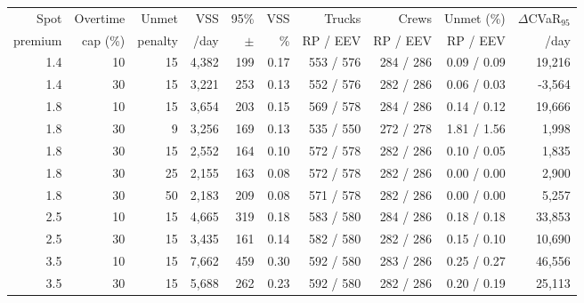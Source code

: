 \begin{tabular}{@{}rrrrrrrrrr@{}}\toprule
Spot & Overtime & Unmet & VSS & 95\% & VSS & Trucks & Crews & Unmet (\%) & $\Delta$CVaR$_{95}$ \\
premium & cap (\%) & penalty & \EUR{}/day & $\pm$ & \% & RP / EEV & RP / EEV & RP / EEV & \EUR{}/day \\ \midrule
1.4 & 10 & 15 & 4{,}382 & 199 & 0.17 & 553 / 576 & 284 / 286 & 0.09 / 0.09 & 19{,}216 \\
1.4 & 30 & 15 & 3{,}221 & 253 & 0.13 & 552 / 576 & 282 / 286 & 0.06 / 0.03 & -3{,}564 \\
1.8 & 10 & 15 & 3{,}654 & 203 & 0.15 & 569 / 578 & 284 / 286 & 0.14 / 0.12 & 19{,}666 \\
1.8 & 30 & 9 & 3{,}256 & 169 & 0.13 & 535 / 550 & 272 / 278 & 1.81 / 1.56 & 1{,}998 \\
1.8 & 30 & 15 & 2{,}552 & 164 & 0.10 & 572 / 578 & 282 / 286 & 0.10 / 0.05 & 1{,}835 \\
1.8 & 30 & 25 & 2{,}155 & 163 & 0.08 & 572 / 578 & 282 / 286 & 0.00 / 0.00 & 2{,}900 \\
1.8 & 30 & 50 & 2{,}183 & 209 & 0.08 & 571 / 578 & 282 / 286 & 0.00 / 0.00 & 5{,}257 \\
2.5 & 10 & 15 & 4{,}665 & 319 & 0.18 & 583 / 580 & 284 / 286 & 0.18 / 0.18 & 33{,}853 \\
2.5 & 30 & 15 & 3{,}435 & 161 & 0.14 & 582 / 580 & 282 / 286 & 0.15 / 0.10 & 10{,}690 \\
3.5 & 10 & 15 & 7{,}662 & 459 & 0.30 & 592 / 580 & 283 / 286 & 0.25 / 0.27 & 46{,}556 \\
3.5 & 30 & 15 & 5{,}688 & 262 & 0.23 & 592 / 580 & 282 / 286 & 0.20 / 0.19 & 25{,}113 \\
\bottomrule\end{tabular}
